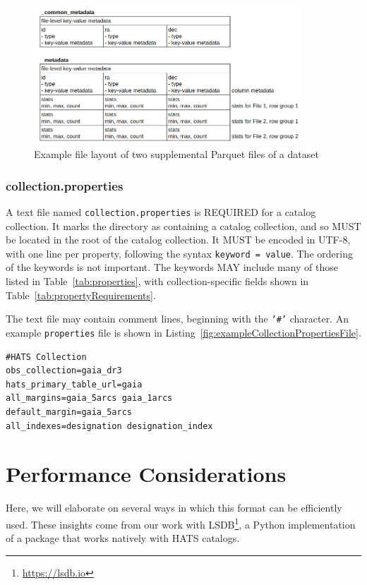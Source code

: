 \documentclass[11pt,a4paper]{ivoa}
\begin{document}
\begin{figure}
\centering
\includegraphics[width=0.9\textwidth]{metadata_files.png}
\caption{Example file layout of two supplemental Parquet files of a dataset}
\label{fig:parquetMetadata}
\end{figure}

\subsubsection{collection.properties}\label{sec:collectionProperties}
A text file named \texttt{collection.properties} is REQUIRED for a catalog collection.
It marks the directory as containing a catalog collection, and so MUST be located in the 
root of the catalog collection.
It MUST be encoded in UTF-8, with one line per property, following the syntax \texttt{keyword = value}.
The ordering of the keywords is not important. 
The keywords MAY include many of those listed in Table~\ref{tab:properties}, with collection-specific fields shown in Table~\ref{tab:propertyRequirements}.

The text file may contain comment lines, beginning with the \texttt{'\#'} character.
An example \texttt{properties} file is shown in Listing~\ref{fig:exampleCollectionPropertiesFile}.

\begin{minipage}{\linewidth}
\begin{lstlisting}[caption=Example \texttt{collection.properties} file contents, label=fig:exampleCollectionPropertiesFile]
#HATS Collection
obs_collection=gaia_dr3
hats_primary_table_url=gaia
all_margins=gaia_5arcs gaia_1arcs
default_margin=gaia_5arcs
all_indexes=designation designation_index
\end{lstlisting}
\end{minipage}

\section{Performance Considerations}
Here, we will elaborate on several ways in which this format can be efficiently used. These insights come from our work with LSDB\footnote{\url{https://lsdb.io}}, a Python implementation of a package that works natively with HATS catalogs. \par
\end{document}
